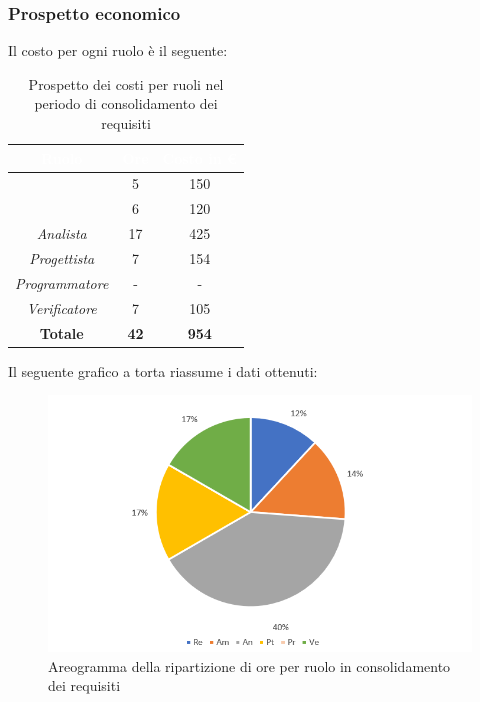 \subsubsection{Prospetto economico}
Il costo per ogni ruolo è il seguente:
\begin{table}[H]
	\begin{center}
		\begin{tabular}{ |c c c|}
		\rowcolor{darkblue} 
		\textcolor{white}{\textbf{Ruolo}} & \textcolor{white}{\textbf{Ore}} & \textcolor{white}{\textbf{Costo in €}}\\ \hline
		{\Responsabile} 			& 5 	& 150 \\ \hline
		{\Amministratore} 			& 6 	& 120 \\ \hline
		\textit{Analista} 			& 17 	& 425 \\ \hline
		\textit{Progettista} 		& 7 	& 154 \\ \hline
		\textit{Programmatore}  	& - 	& - \\ \hline
		\textit{Verificatore} 		& 7 	& 105 \\ \hline
		\textbf{Totale} 			& \textbf{42} & \textbf{954} \\ \hline
		\end{tabular}
	\caption{Prospetto dei costi per ruoli nel periodo di consolidamento dei requisiti}
	\end{center}
\end{table}
Il seguente grafico a torta riassume i dati ottenuti:
\begin{figure}[H]
    \centering
    \includegraphics[scale = 0.75]{Immagini/ConsolidamentoTorta.png}
    \caption{Areogramma della ripartizione di ore per ruolo in consolidamento dei requisiti}
    \label{fig:Areogramma ripartizione ore, periodo di Consolidamento dei Requisiti}
\end{figure}
\newpage

